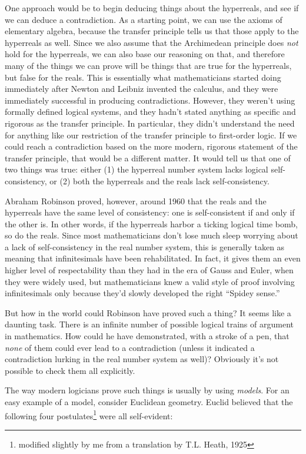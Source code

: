 One approach would be to begin deducing things about the hyperreals, and see if we can deduce a contradiction.
As a starting point, we can use the axioms of elementary algebra, because the transfer principle tells us that
those apply to the hyperreals as well. Since we also assume that the Archimedean principle does \emph{not} hold
for the hyperreals, we can also base our reasoning on that, and therefore many of the things we can prove
will be things that are true for the hyperreals, but false for the reals. This is essentially what mathematicians
started doing immediately after Newton and Leibniz invented the calculus, and they were immediately successful
in producing contradictions. However, they weren't using formally defined logical systems, and they hadn't
stated anything as specific and rigorous as the transfer principle. In particular, they didn't understand
the need for anything like our restriction of the transfer principle to first-order logic. If we could
reach a contradiction based on the more modern, rigorous statement of the transfer principle, that would
be a different matter. It would tell us that one of two things was true: either (1) the hyperreal number system lacks logical self-consistency,
or (2) both the hyperreals and the reals lack self-consistency.

Abraham Robinson proved, however, around 1960 that the reals and the hyperreals have the same level of
consistency: one is self-consistent if and only if the other is. In other words, if the hyperreals harbor
a ticking logical time bomb, so do the reals. Since most mathematicians don't lose much sleep worrying
about a lack of self-consistency in the real number system, this is generally taken as meaning that
infinitesimals have been rehabilitated. In fact, it gives them an even higher level of respectability than
they had in the era of Gauss and Euler, when they were widely used, but mathematicians knew a valid
style of proof involving infinitesimals only because they'd slowly developed the right ``Spidey sense.''

But how in the world could Robinson have proved such a thing? It seems like a daunting task. There is
an infinite number of possible logical trains of argument in mathematics. How could he have demonstrated, with
a stroke of a pen, that \emph{none} of them could ever lead to a contradiction (unless it indicated
a contradiction lurking in the real number system as well)? Obviously it's not possible to check
them all explicitly.

The way modern logicians prove such things is usually by using \emph{models}.
For an easy example of a model, consider Euclidean geometry. Euclid believed that the following four
postulates\footnote{modified slightly by me from a translation by T.L. Heath, 1925} were all self-evident:

